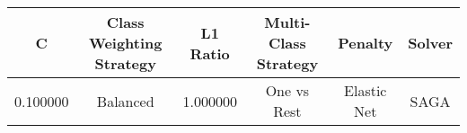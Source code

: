 \small
\begin{tabular}{cccccc}
\toprule
C & Class Weighting Strategy & L1 Ratio & Multi-Class Strategy & Penalty & Solver \\
\midrule
0.100000 & Balanced & 1.000000 & One vs Rest & Elastic Net & SAGA \\
\bottomrule
\end{tabular}

\normalsize